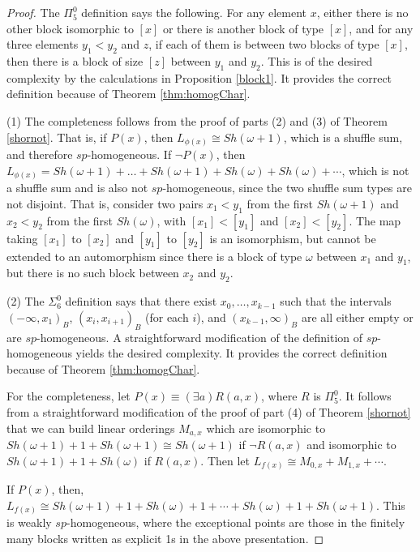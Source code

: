 \documentclass[11pt]{amsart}
\theoremstyle{definition}
\begin{document}
\begin{proof}  The $\Pi^0_5$ definition says the following. For any element $x$, 
either there is no other block isomorphic to $[x]$ or there is another block of type $[x]$, and for any three elements $y_1 < y_2$ and $z$, if each of them is between two blocks of type $[x]$, then there is a block of size $[z]$ between $y_1$ and $y_2$. 
This is of the desired complexity by the calculations in Proposition \ref{block1}.
It provides the correct definition because of Theorem \ref{thm:homogChar}.


(1) The completeness follows from the proof of parts (2) and (3) of Theorem \ref{shornot}. That is, if $P(x)$, then $L_{\phi(x)} \cong Sh(\omega+1)$, which is a shuffle sum, and therefore $sp$-homogeneous. If $\neg P(x)$, then $L_{\phi(x)} = Sh(\omega+1) + \dots +  Sh(\omega+1) + Sh(\omega) + Sh(\omega) + \cdots$, which is not a shuffle sum and is also not $sp$-homogeneous, since the two shuffle sum types are not disjoint. That is, consider two pairs $x_1 < y_1$ from the first $Sh(\omega+1)$ and $x_2 < y_2$ from the first $Sh(\omega)$, with $[x_1] < [y_1]$ and $[x_2] < [y_2]$. The map taking $[x_1]$ to $[x_2]$ and $[y_1]$ to $[y_2]$ is an isomorphism, but cannot be extended to an automorphism since there is a block of type $\omega$ between $x_1$ and $y_1$, but there is no such block between $x_2$ and $y_2$.  

(2) The $\Sigma^0_6$ definition says that there exist $x_0,\dots,x_{k-1}$ such that the intervals $(-\infty, x_1)_B$, $(x_i,x_{i+1})_B$ (for each $i$), and $(x_{k-1},\infty)_B$ are all either empty or are $sp$-homogeneous. A straightforward modification of the definition of $sp$-homogeneous yields the desired complexity.
It provides the correct definition because of Theorem \ref{thm:homogChar}.

For the completeness, let $P(x) \equiv (\exists a)R(a,x)$, where $R$ is $\Pi^0_5$.
It follows from a straightforward modification of the proof of part (4) of Theorem \ref{shornot} that we can build linear orderings $M_{a,x}$ which are isomorphic to $Sh(\omega+1)+1+Sh(\omega+1)\cong Sh(\omega+1)$ if $\neg R(a,x)$ and isomorphic to $Sh(\omega+1)+1+Sh(\omega)$ if $R(a,x)$.  Then let $L_{f(x)} \cong M_{0,x} + M_{1,x} + \dotsb$. 

If $P(x)$, then, $L_{f(x)}  \cong Sh(\omega+1) + 1 + Sh(\omega)  + 1 + \cdots + Sh(\omega) + 1 + Sh(\omega+1)$. This is weakly $sp$-homogeneous, where the exceptional points are those in the finitely many blocks written as explicit 1s in the above presentation. 


\end{proof}
\end{document}
